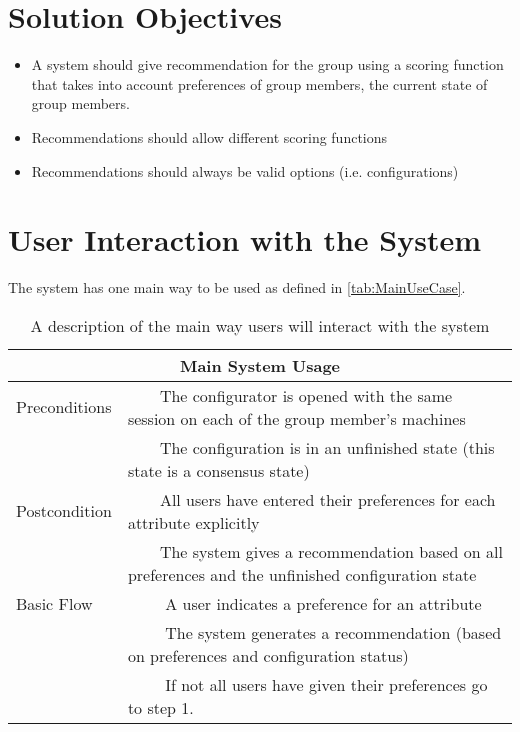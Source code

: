 \documentclass{article}
\newcommand{\tabitem}[1][\textbullet]{~~\llap{#1}~~}
\begin{document}
\section{Solution Objectives}

\begin{itemize}
    \item A system should give recommendation for the group using a scoring function that takes into account preferences of group members, the current state of group members.
    \item Recommendations should allow different scoring functions
    \item Recommendations should always be valid options (i.e. configurations)
\end{itemize}

\section{User Interaction with the System}
The system has one main way to be used as defined in \autoref{tab:MainUseCase}.

\begin{table}
    \begin{center}
        \begin{tabularx}{\columnwidth}{l|X}
            \multicolumn{2}{c}{Main System Usage} \\
            \hline
            Preconditions   & \tabitem The configurator is opened with the same session on each of the group member's machines \\
                            & \tabitem The configuration is in an unfinished state (this state is a consensus state)\\
            \hline
            Postcondition   & \tabitem All users have entered their preferences for each attribute explicitly \\
                            & \tabitem The system gives a recommendation based on all preferences and the unfinished configuration state \\
            \hline
            Basic Flow      & \tabitem[1.] A user indicates a preference for an attribute \\
                            & \tabitem[2.] The system generates a recommendation (based on preferences and configuration status) \\
                            & \tabitem[3.] If not all users have given their preferences go to step 1. \\
            \hline
        \end{tabularx}
        \caption{A description of the main way users will interact with the system}
        \label{tab:MainUseCase}
    \end{center}
\end{table}
\end{document}
